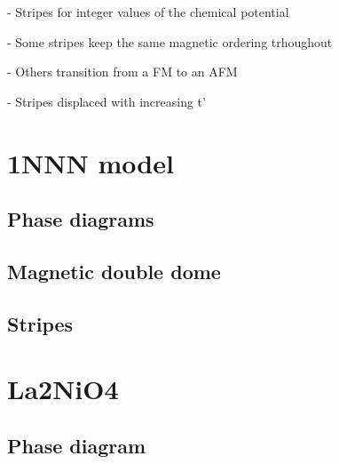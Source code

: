 \documentclass{article}
\begin{document}
- Stripes for integer values of the chemical potential

- Some stripes keep the same magnetic ordering trhoughout

- Others transition from a FM to an AFM

- Stripes displaced with increasing t'



\section{1NNN model}

\subsection{Phase diagrams}

\subsection{Magnetic double dome}

\subsection{Stripes}

\section{La2NiO4}

\subsection{Phase diagram}
\end{document}
